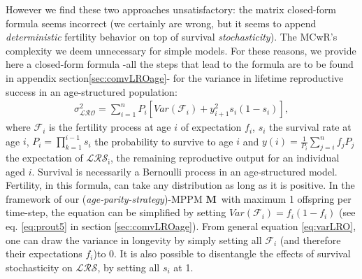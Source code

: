 \documentclass[10pt,a4paper]{article}
\newcommand{\M}{$\mathbf{M}$}
\newcommand{\LRO}{$\mathcal{LRS}$}
\begin{document}
However we find these two approaches unsatisfactory: the matrix closed-form formula seems incorrect (we certainly are wrong, but it seems to append \emph{deterministic} fertility behavior on top of survival \emph{stochasticity}). The MCwR's complexity we deem unnecessary for simple models. For these reasons, we provide here a closed-form formula -all the steps that lead to the formula are to be found in appendix section\ref{sec:comvLROage}- for the variance in lifetime reproductive success in an age-structured population: 
\begin{eqnarray}
\sigma^{2}_{\mathcal{LRO}}=\sum_{i=1}^{n} P_{i}\left[ Var(\mathcal{F}_{i}) +y_{i+1}^{2}s_{i}(1-s_{i})\right],
\label{eq:varLRO}
\end{eqnarray}
where $\mathcal{F}_{i}$ is the fertility process at age $i$ of expectation $f_{i}$, $s_{i}$ the survival rate at age $i$, $P_{i}=\prod_{k=1}^{i-1} s_{i}$  the probability to survive to age $i$ and 
$y(i)= \frac{1}{P_{i}} \sum_{j=i}^{n} f_{j}P_{j}$ the expectation of $\mathcal{LRS_{\mathrm{i}}}$, the remaining reproductive output for an individual aged $i$.
Survival is necessarily a Bernoulli process in an age-structured model. Fertility, in this formula, can take any distribution as long as it is positive. In the framework of our (\emph{age-parity-strategy})-MPPM \M\ with maximum 1 offspring per time-step, the equation can be simplified by setting $Var(\mathcal{F}_{i})=f_{i}(1-f_{i})$ (see eq. \ref{eq:prout5} in section \ref{sec:comvLROage}).
From general equation \ref{eq:varLRO}, one can draw the variance in longevity by simply setting all $\mathcal{F}_{i}$ (and therefore their expectations $f_{i}$)to 0. It is also possible to disentangle the effects of survival stochasticity on \LRO, by setting all $s_{i}$ at 1.



\end{document}
